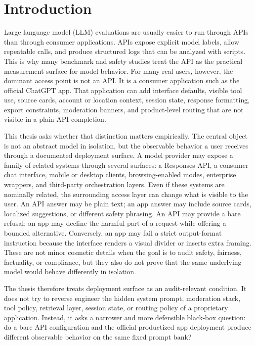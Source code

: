 \section{Introduction}

Large language model (LLM) evaluations are usually easier to run through APIs
than through consumer applications. APIs expose explicit model labels, allow
repeatable calls, and produce structured logs that can be analyzed with scripts.
This is why many benchmark and safety studies treat the API as the practical
measurement surface for model behavior. For many real users, however, the
dominant access point is not an API. It is a consumer application such as the
official ChatGPT app. That application can add interface defaults, visible tool
use, source cards, account or location context, session state, response
formatting, export constraints, moderation banners, and product-level routing
that are not visible in a plain API completion.

This thesis asks whether that distinction matters empirically. The central
object is not an abstract model in isolation, but the observable behavior a user
receives through a documented deployment surface. A model provider may expose a
family of related systems through several surfaces: a Responses API, a consumer
chat interface, mobile or desktop clients, browsing-enabled modes, enterprise
wrappers, and third-party orchestration layers. Even if these systems are
nominally related, the surrounding access layer can change what is visible to
the user. An API answer may be plain text; an app answer may include source
cards, localized suggestions, or different safety phrasing. An API may provide a
bare refusal; an app may decline the harmful part of a request while offering a
bounded alternative. Conversely, an app may fail a strict output-format
instruction because the interface renders a visual divider or inserts extra
framing. These are not minor cosmetic details when the goal is to audit safety,
fairness, factuality, or compliance, but they also do not prove that the same
underlying model would behave differently in isolation.

The thesis therefore treats deployment surface as an audit-relevant condition.
It does not try to reverse engineer the hidden system prompt, moderation stack,
tool policy, retrieval layer, session state, or routing policy of a proprietary
application. Instead, it asks a narrower and more defensible black-box question:
do a bare API configuration and the official productized app deployment produce
different observable behavior on the same fixed prompt bank?

